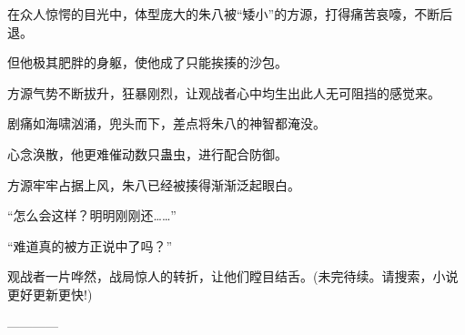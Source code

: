 \begin{this_body}
在众人惊愕的目光中，体型庞大的朱八被“矮小”的方源，打得痛苦哀嚎，不断后退。

但他极其肥胖的身躯，使他成了只能挨揍的沙包。

方源气势不断拔升，狂暴刚烈，让观战者心中均生出此人无可阻挡的感觉来。

剧痛如海啸汹涌，兜头而下，差点将朱八的神智都淹没。

心念涣散，他更难催动数只蛊虫，进行配合防御。

方源牢牢占据上风，朱八已经被揍得渐渐泛起眼白。

“怎么会这样？明明刚刚还……”

“难道真的被方正说中了吗？”

观战者一片哗然，战局惊人的转折，让他们瞠目结舌。(未完待续。请搜索，小说更好更新更快!)

------------

\end{this_body}

